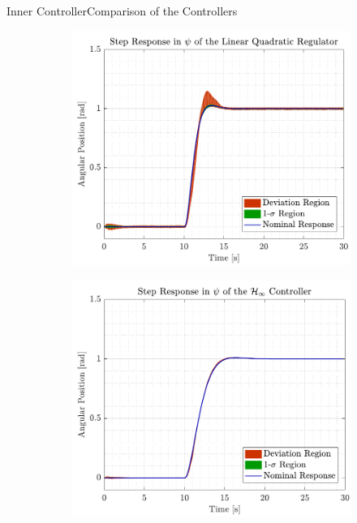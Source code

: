 \begin{frame}{Inner Controller}{Comparison of the Controllers}
  \begin{figure}[H]
    \begin{minipage}{0.45\linewidth}
      \begin{figure}[H]
        \centering
        \includegraphics[width=1\linewidth]{figures/yaw_mc_lqr}
      \end{figure}        
    \end{minipage}\hfill      
    \begin{minipage}{0.45\linewidth}
      \begin{figure}[H]
        \centering
        \includegraphics[width=1\linewidth]{figures/yaw_mc_rob}

\end{figure}
\end{minipage}
\end{figure}
\end{frame}
